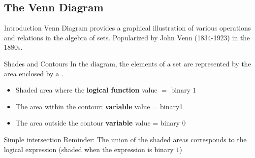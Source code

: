 \subsection{The Venn Diagram}
\begin{parag}{Introduction}
    Venn Diagram provides a graphical illustration of various operations and relations in the algebra of sets. Popularized by John Venn (1834-1923) in the 1880s.
\end{parag}
\begin{parag}{Shades and Contours}
    In the diagram, the elements of a set are represented by the area enclosed by a . \\
\begin{itemize}
    \item  Shaded area where the \textbf{logical function} value $=$ binary $1$
    \item The area within the contour: \textbf{variable} value = binary1 
    \item The area outside the contour \textbf{variable} value = binary $0$
\end{itemize}
\begin{subparag}{Simple intersection}
    Reminder: The union of the shaded areas corresponds to the logical expression (shaded when the expression is binary $1$)
\end{subparag}
\end{parag}
